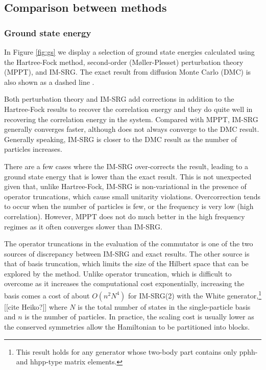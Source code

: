 \subsection{Comparison between methods}

\subsubsection{Ground state energy}

In Figure \ref{fig:gs} we display a selection of ground state energies calculated using the Hartree-Fock method, second-order (M\o ller-Plesset) perturbation theory (MPPT), and IM-SRG.  The exact result from diffusion Monte Carlo (DMC) is also shown as a dashed line \cite{PhysRevB.84.115302}.

Both perturbation theory and IM-SRG add corrections in addition to the Hartree-Fock results to recover the correlation energy and they do quite well in recovering the correlation energy in the system.  Compared with MPPT, IM-SRG generally converges faster, although does not always converge to the DMC result.  Generally speaking, IM-SRG is closer to the DMC result as the number of particles increases.

There are a few cases where the IM-SRG over-corrects the result, leading to a ground state energy that is lower than the exact result.  This is not unexpected given that, unlike Hartree-Fock, IM-SRG is non-variational in the presence of operator truncations, which cause small unitarity violations.  Overcorrection tends to occur when the number of particles is few, or the frequency is very low (high correlation).  However, MPPT does not do much better in the high frequency regimes as it often converges slower than IM-SRG.

The operator truncations in the evaluation of the commutator is one of the two sources of discrepancy between IM-SRG and exact results.  The other source is that of basis truncation, which limits the size of the Hilbert space that can be explored by the method.  Unlike operator truncation, which is difficult to overcome as it increases the computational cost exponentially, increasing the basis comes a cost of about $O(n^2 N^4)$ for IM-SRG(2) with the White generator,\footnote{This result holds for any generator whose two-body part contains only pphh- and hhpp-type matrix elements.} [[cite Heiko?]] where $N$ is the total number of states in the single-particle basis and $n$ is the number of particles.  In practice, the scaling cost is usually lower as the conserved symmetries allow the Hamiltonian to be partitioned into blocks.

